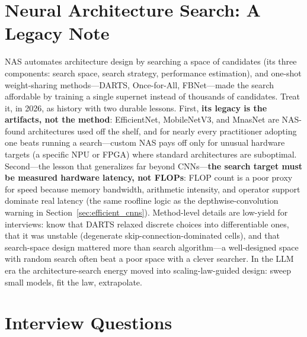 \section{Neural Architecture Search: A Legacy Note}
\label{sec:nas}

NAS automates architecture design by searching a space of candidates (its three components: search space, search strategy, performance estimation), and one-shot weight-sharing methods---DARTS, Once-for-All, FBNet---made the search affordable by training a single supernet instead of thousands of candidates. Treat it, in 2026, as history with two durable lessons. First, \textbf{its legacy is the artifacts, not the method}: EfficientNet, MobileNetV3, and MnasNet are NAS-found architectures used off the shelf, and for nearly every practitioner adopting one beats running a search---custom NAS pays off only for unusual hardware targets (a specific NPU or FPGA) where standard architectures are suboptimal. Second---the lesson that generalizes far beyond CNNs---\textbf{the search target must be measured hardware latency, not FLOPs}: FLOP count is a poor proxy for speed because memory bandwidth, arithmetic intensity, and operator support dominate real latency (the same roofline logic as the depthwise-convolution warning in Section~\ref{sec:efficient_cnns}). Method-level details are low-yield for interviews: know that DARTS relaxed discrete choices into differentiable ones, that it was unstable (degenerate skip-connection-dominated cells), and that search-space design mattered more than search algorithm---a well-designed space with random search often beat a poor space with a clever searcher. In the LLM era the architecture-search energy moved into scaling-law-guided design: sweep small models, fit the law, extrapolate.

\section{Interview Questions}
\label{sec:efficient_arch_interview}

